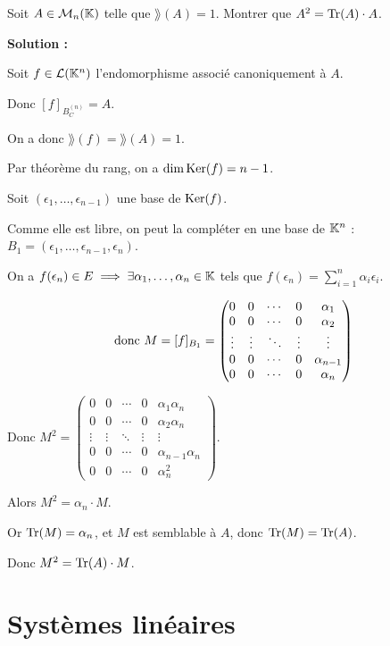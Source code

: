 \documentclass[12pt, a4paper]{report}
\begin{document}
\begin{exercise}
    Soit $A \in \mathcal M_n(\mathbb{K})$ telle que $\rang(A) = 1$. Montrer que $A^2 = \mathrm{Tr}(A) \cdot A$.

    \textbf{Solution :}

    Soit $f \in \mathcal L(\mathbb{K}^n)$ l'endomorphisme associé canoniquement à $A$.

    Donc $[f]_{B_C^{(n)}} = A$.

    On a donc $\rang(f) = \rang(A) = 1$.

    Par théorème du rang, on a $\dim \mathrm{Ker}(f) = n - 1$.

    Soit $(\epsilon_1,\dots,\epsilon_{n-1})$ une base de $\mathrm{Ker}(f)$.

    Comme elle est libre, on peut la compléter en une base de $\mathbb{K}^n$ : $B_1 = (\epsilon_1,\dots,\epsilon_{n-1},\epsilon_n)$.

    On a $f(\epsilon_n) \in E \implies \exists \alpha_1,\dots,\alpha_n \in \mathbb{K}$ tels que $f(\epsilon_n) = \sum_{i=1}^n \alpha_i \epsilon_i$.

    $$\text{ donc } M = [f]_{B_1} = \left(\begin{matrix}
        0 & 0 & \cdots & 0 & \alpha_1 \\
        0 & 0 & \cdots & 0 & \alpha_2 \\
        \vdots & \vdots & \ddots & \vdots & \vdots \\
        0 & 0 & \cdots & 0 & \alpha_{n-1} \\
        0 & 0 & \cdots & 0 & \alpha_n
    \end{matrix}\right)$$

    Donc $M^2 = \left(\begin{matrix}
        0 & 0 & \cdots & 0 & \alpha_1 \alpha_n \\
        0 & 0 & \cdots & 0 & \alpha_2 \alpha_n \\
        \vdots & \vdots & \ddots & \vdots & \vdots \\
        0 & 0 & \cdots & 0 & \alpha_{n-1} \alpha_n \\
        0 & 0 & \cdots & 0 & \alpha_n^2
    \end{matrix}\right)$.

    Alors $M^2 = \alpha_n \cdot M$.

    Or $\mathrm{Tr}(M) = \alpha_n$, et $M$ est semblable à $A$, donc $\mathrm{Tr}(M) = \mathrm{Tr}(A)$.

    Donc $M^2 = \mathrm{Tr}(A) \cdot M$.
\end{exercise}

\chapter{Systèmes linéaires}
\end{document}
